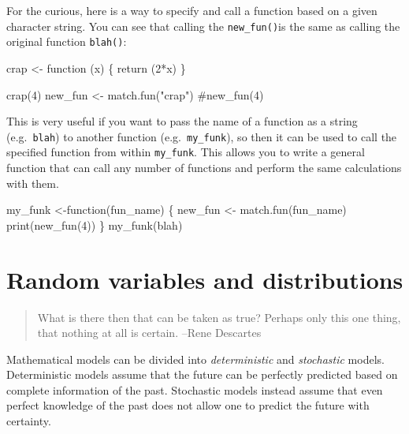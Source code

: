 \documentclass[
  letterpaper,
  DIV=11,
  numbers=noendperiod]{scrreprt}
\newenvironment{Shaded}{\begin{snugshade}}{\end{snugshade}}
\newcommand{\NormalTok}[1]{\textcolor[rgb]{0.00,0.23,0.31}{#1}}
\begin{document}
For the curious, here is a way to specify and call a function based on a
given character string. You can see that calling the
\texttt{new\_fun()}is the same as calling the original function
\texttt{blah()}:

\begin{Shaded}
\begin{Highlighting}[]
\NormalTok{crap \textless{}{-} function (x) \{}
\NormalTok{  return (2*x)}
\NormalTok{\}}

\NormalTok{crap(4)}
\NormalTok{new\_fun \textless{}{-} match.fun("crap")}
\NormalTok{\#new\_fun(4)}
\end{Highlighting}
\end{Shaded}

This is very useful if you want to pass the name of a function as a
string (e.g.~\texttt{blah}) to another function
(e.g.~\texttt{my\_funk}), so then it can be used to call the specified
function from within \texttt{my\_funk}. This allows you to write a
general function that can call any number of functions and perform the
same calculations with them.

\begin{Shaded}
\begin{Highlighting}[]
\NormalTok{my\_funk \textless{}{-}function(fun\_name) \{}
\NormalTok{  new\_fun \textless{}{-} match.fun(fun\_name)}
\NormalTok{  print(new\_fun(4))}
\NormalTok{\}}
\NormalTok{my\_funk(\textquotesingle{}blah\textquotesingle{})}
\end{Highlighting}
\end{Shaded}


\hypertarget{random-variables-and-distributions}{%
\chapter{Random variables and
distributions}\label{random-variables-and-distributions}}

\begin{quote}
What is there then that can be taken as true? Perhaps only this one
thing, that nothing at all is certain. --Rene Descartes
\end{quote}

Mathematical models can be divided into \emph{deterministic} and
\emph{stochastic} models. Deterministic models assume that the future
can be perfectly predicted based on complete information of the past.
Stochastic models instead assume that even perfect knowledge of the past
does not allow one to predict the future with certainty.
\end{document}
